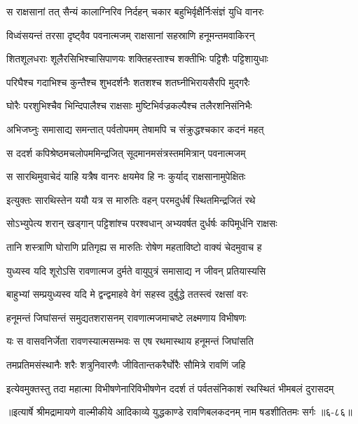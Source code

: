 \twolineshloka
{स राक्षसानां तत् सैन्यं कालाग्निरिव निर्दहन्}
{चकार बहुभिर्वृक्षैर्निःसंज्ञं युधि वानरः} %

\twolineshloka
{विध्वंसयन्तं तरसा दृष्ट्वैव पवनात्मजम्}
{राक्षसानां सहस्राणि हनूमन्तमवाकिरन्} %

\twolineshloka
{शितशूलधराः शूलैरसिभिश्चासिपाणयः}
{शक्तिहस्ताश्च शक्तीभिः पट्टिशैः पट्टिशायुधाः} %

\twolineshloka
{परिघैश्च गदाभिश्च कुन्तैश्च शुभदर्शनैः}
{शतशश्च शतघ्नीभिरायसैरपि मुद्गरैः} %

\twolineshloka
{घोरैः परशुभिश्चैव भिन्दिपालैश्च राक्षसाः}
{मुष्टिभिर्वज्रकल्पैश्च तलैरशनिसंनिभैः} %

\twolineshloka
{अभिजघ्नुः समासाद्य समन्तात् पर्वतोपमम्}
{तेषामपि च संक्रुद्धश्चकार कदनं महत्} %

\twolineshloka
{स ददर्श कपिश्रेष्ठमचलोपममिन्द्रजित्}
{सूदमानमसंत्रस्तममित्रान् पवनात्मजम्} %

\twolineshloka
{स सारथिमुवाचेदं याहि यत्रैष वानरः}
{क्षयमेव हि नः कुर्याद् राक्षसानामुपेक्षितः} %

\twolineshloka
{इत्युक्तः सारथिस्तेन ययौ यत्र स मारुतिः}
{वहन् परमदुर्धर्षं स्थितमिन्द्रजितं रथे} %

\twolineshloka
{सोऽभ्युपेत्य शरान् खड्गान् पट्टिशांश्च परश्वधान्}
{अभ्यवर्षत दुर्धर्षः कपिमूर्धनि राक्षसः} %

\twolineshloka
{तानि शस्त्राणि घोराणि प्रतिगृह्य स मारुतिः}
{रोषेण महताविष्टो वाक्यं चेदमुवाच ह} %

\twolineshloka
{युध्यस्व यदि शूरोऽसि रावणात्मज दुर्मते}
{वायुपुत्रं समासाद्य न जीवन् प्रतियास्यसि} %

\twolineshloka
{बाहुभ्यां सम्प्रयुध्यस्व यदि मे द्वन्द्वमाहवे}
{वेगं सहस्व दुर्बुद्धे ततस्त्वं रक्षसां वरः} %

\twolineshloka
{हनूमन्तं जिघांसन्तं समुद्यतशरासनम्}
{रावणात्मजमाचष्टे लक्ष्मणाय विभीषणः} %

\twolineshloka
{यः स वासवनिर्जेता रावणस्यात्मसम्भवः}
{स एष रथमास्थाय हनूमन्तं जिघांसति} %

\twolineshloka
{तमप्रतिमसंस्थानैः शरैः शत्रुनिवारणैः}
{जीवितान्तकरैर्घोरैः सौमित्रे रावणिं जहि} %

\twolineshloka
{इत्येवमुक्तस्तु तदा महात्मा विभीषणेनारिविभीषणेन}
{ददर्श तं पर्वतसंनिकाशं रथस्थितं भीमबलं दुरासदम्} %


॥इत्यार्षे श्रीमद्रामायणे वाल्मीकीये आदिकाव्ये युद्धकाण्डे रावणिबलकदनम् नाम षडशीतितमः सर्गः ॥६-८६॥
